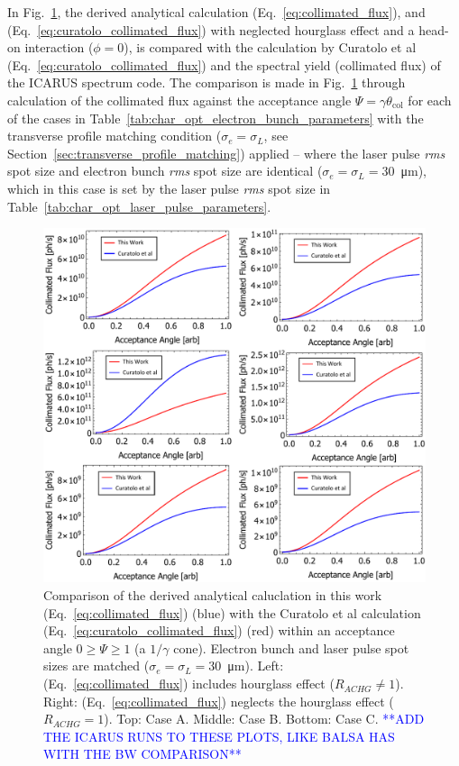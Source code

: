\documentclass[../main.tex]{subfiles}
\begin{document}
In Fig.~\ref{fig:curatolo_collimated_flux_comparison}, the derived analytical calculation (Eq.~\ref{eq:collimated_flux}), and (Eq.~\ref{eq:curatolo_collimated_flux}) with neglected hourglass effect and a head-on interaction ($\phi = 0$), is compared with the calculation by Curatolo et al \cite{curatolo2017analytical} (Eq.~\ref{eq:curatolo_collimated_flux}) and the spectral yield (collimated flux) of the \textsc{ICARUS} spectrum code. The comparison is made in Fig.~\ref{fig:curatolo_collimated_flux_comparison} through calculation of the collimated flux against the acceptance angle $\Psi = \gamma\theta_{\mathrm{col}}$ for each of the cases in Table~\ref{tab:char_opt_electron_bunch_parameters} with the transverse profile matching condition ($\sigma_{e} = \sigma_{L}$, see Section~\ref{sec:transverse_profile_matching}) applied -- where the laser pulse \textit{rms} spot size and electron bunch \textit{rms} spot size are identical ($\sigma_{e} = \sigma_{L} = 30$~\si{\micro\meter}), which in this case is set by the laser pulse \textit{rms} spot size in Table~\ref{tab:char_opt_laser_pulse_parameters}.    

\begin{figure}[!h]
\centering
\includegraphics[width=\textwidth]{Figures/Optimisation_and_Characterisation_of_Inverse_Compton_Scattering_Sources/Opt_Char_Fcol_Curatolo_Comp_FINAL.pdf}
\caption{Comparison of the derived analytical caluclation in this work (Eq.~\ref{eq:collimated_flux}) (blue) with the Curatolo et al \cite{curatolo2017analytical} calculation (Eq.~\ref{eq:curatolo_collimated_flux}) (red) within an acceptance angle $0 \geq \Psi \geq 1$ (a $1/\gamma$ cone). Electron bunch and laser pulse spot sizes are matched ($\sigma_{e}=\sigma_{L}=30$~\si{\micro\meter}). Left: (Eq.~\ref{eq:collimated_flux}) includes hourglass effect ($R_{ACHG}\neq 1$). Right: (Eq.~\ref{eq:collimated_flux}) neglects the hourglass effect ($R_{ACHG} = 1$). Top: Case A. Middle: Case B. Bottom: Case C. \textcolor{blue}{**ADD THE ICARUS RUNS TO THESE PLOTS, LIKE BALSA HAS WITH THE BW COMPARISON**}}
\label{fig:curatolo_collimated_flux_comparison}
\end{figure}
\end{document}
